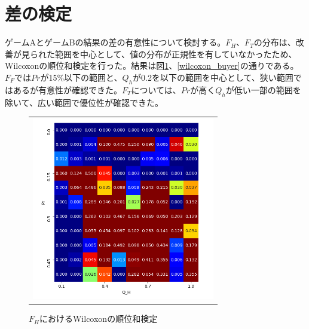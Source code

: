 \documentclass[a4paper,fontsize=11pt,report,notitlepage,line_length=38zw,number_of_lines=40,dvipdfmx]{jlreq}
\begin{document}
\section{差の検定}
ゲームAとゲームBの結果の差の有意性について検討する。$F_H$、$F_T$の分布は、改善が見られた範囲を中心として、値の分布が正規性を有していなかったため、Wilcoxonの順位和検定を行った。結果は図\ref{wilcoxon_seller}、\ref{wilcoxon_buyer}の通りである。$F_F$では$Pr$が15\%以下の範囲と、$Q_h$が0.2を以下の範囲を中心として、狭い範囲ではあるが有意性が確認できた。$F_T$については、$Pr$が高く$Q_h$が低い一部の範囲を除いて、広い範囲で優位性が確認できた。

\begin{figure}[hbtp]
  \begin{center}
    \begin{tabular}{c}
      \begin{minipage}{0.5\hsize}
        \begin{center}
          \includegraphics[width=8cm]{wilcoxon_seller.png}
          \caption{$F_H$におけるWilcoxonの順位和検定}
          \label{wilcoxon_seller}
        \end{center}
      \end{minipage}


\end{tabular}
\end{center}
\end{figure}
\end{document}
